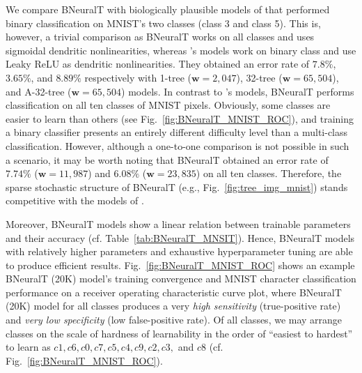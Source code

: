 \documentclass[11pt,a4paper]{article}
\begin{document}
    We compare BNeuralT with biologically plausible models of \cite{jones2021might} that performed binary classification on MNIST's two classes (class 3 and class 5). This is, however, a trivial comparison as BNeuralT works on all classes and uses sigmoidal dendritic  nonlinearities, whereas \cite{jones2021might}'s models work on binary class and use Leaky ReLU as dendritic  nonlinearities. They obtained an error rate of $7.8\%$, $3.65\%$, and $8.89\%$ respectively with 1-tree ($\textbf{w}=2,047$), 32-tree ($\textbf{w}=65,504$), and A-32-tree ($\textbf{w}=65,504$) models. In contrast to \cite{jones2021might}'s models,  BNeuralT performs classification on all ten classes of MNIST pixels. Obviously, some classes are easier to learn than others (see Fig.~\ref{fig:BNeuralT_MNIST_ROC}), and training a binary classifier presents an entirely different difficulty level than a multi-class classification. However, although a one-to-one comparison is not possible in such a scenario, it may be worth noting that BNeuralT obtained an error rate of $7.74\%$ ($\textbf{w}=11,987$) and $6.08\%$ ($\textbf{w}=23,835$) on all ten classes. Therefore,  the sparse stochastic structure of BNeuralT (e.g., Fig.~\ref{fig:tree_img_mnist}) stands competitive with the models of  \cite{jones2021might}. 
    	




    Moreover, BNeuralT models show a linear relation between trainable parameters and their accuracy (cf. Table~\ref{tab:BNeuralT_MNSIT}). Hence, BNeuralT models with relatively higher parameters and exhaustive hyperparameter tuning are able to produce efficient results. 
Fig.~\ref{fig:BNeuralT_MNIST_ROC} shows an example BNeuralT (20K) model's training convergence and MNIST character classification performance on a receiver operating characteristic curve plot, where BNeuralT (20K) model for all classes produces a very \textit{high sensitivity} (true-positive rate) and \textit{very low specificity} (low false-positive rate). Of all classes, we may arrange classes on the scale of hardness of learnability in the order of ``easiest to hardest'' to learn as $c1, c6, c0, c7, c5, c4, c9, c2, c3,$ and $c8$ (cf.  Fig.~\ref{fig:BNeuralT_MNIST_ROC}).
    	
\end{document}
